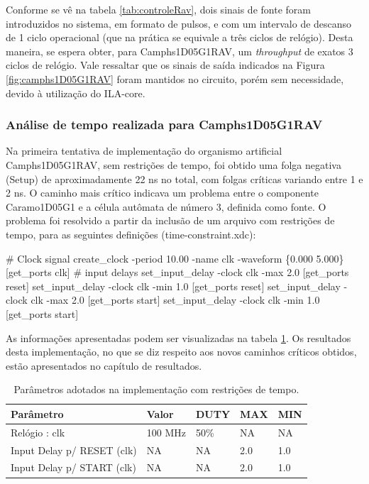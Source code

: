 Conforme se vê na tabela \ref{tab:controleRav}, dois sinais de fonte foram introduzidos no sistema, em formato de pulsos, e com um intervalo de descanso de 1 ciclo operacional (que na prática se equivale a três ciclos de relógio). Desta maneira, se espera obter, para Camphs1D05G1RAV, um \textit{throughput} de exatos 3 ciclos de relógio. Vale ressaltar que os sinais de saída indicados na Figura \ref{fig:camphs1D05G1RAV} foram mantidos no circuito, porém sem necessidade, devido à utilização do ILA-core.

\subsubsection{Análise de tempo realizada para Camphs1D05G1RAV}

Na primeira tentativa de implementação do organismo artificial Camphs1D05G1RAV, sem restrições de tempo, foi obtido uma folga negativa (Setup) de  aproximadamente 22 ns no total, com folgas críticas variando entre 1 e 2 ns. O caminho mais crítico indicava um problema entre o componente Caramo1D05G1 e a célula autômata de número 3, definida como fonte. O problema foi resolvido a partir da inclusão de um arquivo com restrições de tempo, para as seguintes definições (time-constraint.xdc):
\\
\begin{algorithmic}[1]
   \State \# Clock signal
   \State create\_clock -period 10.00 -name clk -waveform \{0.000 5.000\} [get\_ports clk]
   \State 
   \State \# input delays
   \State set\_input\_delay -clock clk -max 2.0 [get\_ports reset]
   \State set\_input\_delay -clock clk -min 1.0 [get\_ports reset]
   \State
   \State set\_input\_delay -clock clk -max 2.0 [get\_ports start]
   \State set\_input\_delay -clock clk -min 1.0 [get\_ports start]
\end{algorithmic}

As informações apresentadas podem ser visualizadas na tabela \ref{tab:timeset}. Os resultados desta implementação, no que se diz respeito aos novos caminhos críticos obtidos, estão apresentados no capítulo de resultados.

\begin{table}[h]
\centering
\caption{\label{tab:timeset} Parâmetros adotados na implementação com restrições de tempo.}
\begin{tabular}{ |p{6cm}|p{2cm}|p{1cm}|p{1cm}|p{1cm}|  }
 \hline
 Parâmetro & Valor & DUTY & MAX & MIN \\
 \hline
 Relógio : clk & 100 MHz & 50\% & NA & NA \\
 \hline
 Input Delay p/ RESET (clk) & NA & NA & 2.0 & 1.0 \\
 \hline
 Input Delay p/ START (clk) & NA & NA & 2.0 & 1.0 \\
 \hline
\end{tabular}
\end{table}

